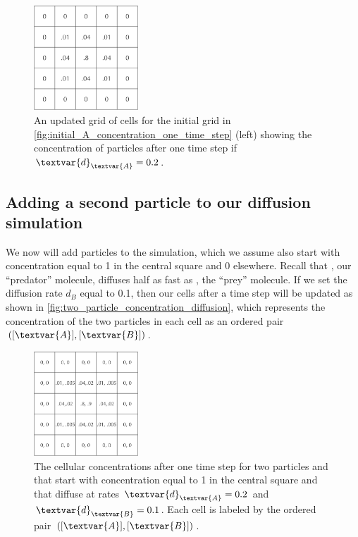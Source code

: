 \begin{figure}[h]
\centering
\mySfFamily
\includegraphics[width = 0.35\textwidth]{../images/A_concentration_slower_diffusion}
\caption{An updated grid of cells for the initial grid in \autoref{fig:initial_A_concentration_one_time_step} (left) showing the concentration of  particles after one time step if $\textvar{d}_\textvar{A} = \text{0.2}$.}
\label{fig:A_concentration_slower_diffusion}
\end{figure}

\subsection{Adding a second particle to our diffusion simulation}

We now will add  particles to the simulation, which we assume also start with concentration equal to 1 in the central square and 0 elsewhere. Recall that , our ``predator'' molecule, diffuses half as fast as , the ``prey'' molecule. If we set the diffusion rate $d_B$ equal to 0.1, then our cells after a time step will be updated as shown in \autoref{fig:two_particle_concentration_diffusion}, which represents the concentration of the two particles in each cell as an ordered pair $([\textvar{A}], [\textvar{B}])$.\\

\begin{figure}[h]
\centering
\mySfFamily
\includegraphics[width = 0.35\textwidth]{../images/two_particle_concentration_diffusion}
\caption{The cellular concentrations after one time step for two particles  and  that start with concentration equal to 1 in the central square and that diffuse at rates $\textvar{d}_\textvar{A} = \text{0.2}$ and $\textvar{d}_\textvar{B} = \text{0.1}$. Each cell is labeled by the ordered pair $([\textvar{A}], [\textvar{B}])$.}
\label{fig:two_particle_concentration_diffusion}
\end{figure}

